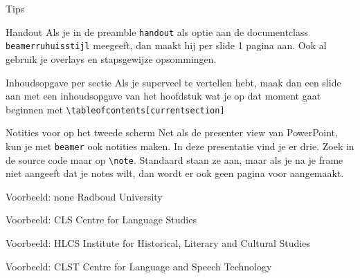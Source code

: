 \documentclass[department=ds, notes={hide notes}, slidesperpage=4, handout, official=true]{beamerruhuisstijl}
\begin{document}
\begin{frame}{Tips}
    \begin{block}{Handout}
        Als je in de preamble \texttt{handout} als optie aan de documentclass \texttt{beamerruhuisstijl} meegeeft, dan maakt hij per slide 1 pagina aan. Ook al gebruik je overlays en stapsgewijze opsommingen.
    \end{block}

    \begin{block}{Inhoudsopgave per sectie}
        Als je superveel te vertellen hebt, maak dan een slide aan met een inhoudsopgave van het hoofdstuk wat je op dat moment gaat beginnen met \texttt{\textbackslash tableofcontents[currentsection]}
    \end{block}

    \begin{block}{Notities voor op het tweede scherm}
        Net als de presenter view van PowerPoint, kun je met \texttt{beamer} ook notities maken. In deze presentatie vind je er drie. Zoek in de source code maar op \texttt{\textbackslash note}. Standaard staan ze aan, maar als je na je frame niet aangeeft dat je notes wilt, dan wordt er ook geen pagina voor aangemaakt. 
    \end{block}
\end{frame}

\renewcommand{\dept}{none}
\begin{frame}
    \titlepage
\end{frame}
\begin{frame}{Voorbeeld: none}
    Radboud University
\end{frame}

\renewcommand{\dept}{cls}
\begin{frame}
    \titlepage
\end{frame}
\begin{frame}{Voorbeeld: CLS}
    Centre for Language Studies
\end{frame}

\renewcommand{\dept}{hlcs}
\begin{frame}
    \titlepage
\end{frame}
\begin{frame}{Voorbeeld: HLCS}
    Institute for Historical, Literary and Cultural Studies
\end{frame}

\renewcommand{\dept}{clst}
\begin{frame}
    \titlepage
\end{frame}
\begin{frame}{Voorbeeld: CLST}
    Centre for Language and Speech Technology
\end{frame}
\end{document}
